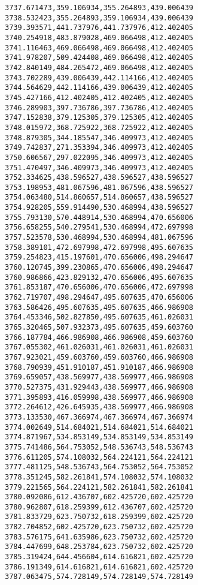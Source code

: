 \documentclass[11pt]{article}
\begin{document}
\begin{Verbatim}[commandchars=\\\{\}]
3737.671473,359.106934,355.264893,439.006439
3738.532423,355.264893,359.106934,439.006439
3739.393571,441.737976,441.737976,412.402405
3740.254918,483.879028,469.066498,412.402405
3741.116463,469.066498,469.066498,412.402405
3741.978207,509.424408,469.066498,412.402405
3742.840149,484.265472,469.066498,412.402405
3743.702289,439.006439,442.114166,412.402405
3744.564629,442.114166,439.006439,412.402405
3745.427166,412.402405,412.402405,412.402405
3746.289903,397.736786,397.736786,412.402405
3747.152838,379.125305,379.125305,412.402405
3748.015972,368.725922,368.725922,412.402405
3748.879305,344.185547,346.409973,412.402405
3749.742837,271.353394,346.409973,412.402405
3750.606567,297.022095,346.409973,412.402405
3751.470497,346.409973,346.409973,412.402405
3752.334625,438.596527,438.596527,438.596527
3753.198953,481.067596,481.067596,438.596527
3754.063480,514.860657,514.860657,438.596527
3754.928205,559.914490,530.468994,438.596527
3755.793130,570.448914,530.468994,470.656006
3756.658255,540.279541,530.468994,472.697998
3757.523578,530.468994,530.468994,481.067596
3758.389101,472.697998,472.697998,495.607635
3759.254823,415.197601,470.656006,498.294647
3760.120745,399.230865,470.656006,498.294647
3760.986866,423.829132,470.656006,495.607635
3761.853187,470.656006,470.656006,472.697998
3762.719707,498.294647,495.607635,470.656006
3763.586426,495.607635,495.607635,466.986908
3764.453346,502.827850,495.607635,461.026031
3765.320465,507.932373,495.607635,459.603760
3766.187784,466.986908,466.986908,459.603760
3767.055302,461.026031,461.026031,461.026031
3767.923021,459.603760,459.603760,466.986908
3768.790939,451.910187,451.910187,466.986908
3769.659057,438.569977,438.569977,466.986908
3770.527375,431.929443,438.569977,466.986908
3771.395893,416.059998,438.569977,466.986908
3772.264612,426.645935,438.569977,466.986908
3773.133530,467.366974,467.366974,467.366974
3774.002649,514.684021,514.684021,514.684021
3774.871967,534.853149,534.853149,534.853149
3775.741486,564.753052,548.536743,548.536743
3776.611205,574.108032,564.224121,564.224121
3777.481125,548.536743,564.753052,564.753052
3778.351245,582.261841,574.108032,574.108032
3779.221565,564.224121,582.261841,582.261841
3780.092086,612.436707,602.425720,602.425720
3780.962807,618.259399,612.436707,602.425720
3781.833729,623.750732,618.259399,602.425720
3782.704852,602.425720,623.750732,602.425720
3783.576175,641.635986,623.750732,602.425720
3784.447699,648.253784,623.750732,602.425720
3785.319424,644.456604,614.616821,602.425720
3786.191349,614.616821,614.616821,602.425720
3787.063475,574.728149,574.728149,574.728149

\end{Verbatim}
\end{document}
